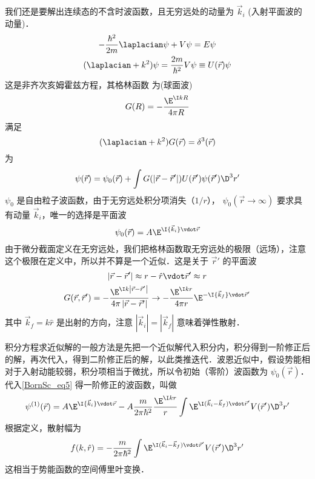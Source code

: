 
我们还是要解出连续态的不含时波函数，且无穷远处的动量为 $\vec k_i$ (入射平面波的动量)．
\begin{gather}
- \frac{{{\hbar ^2}}}{{2m}}{\laplacian}\psi  + V\psi  = E\psi \\
({\laplacian} + {k^2})\psi  = \frac{{2m}}{{{\hbar ^2}}}V\psi  \equiv U(\vec r)\psi
\end{gather}
这是非齐次亥姆霍兹方程，其格林函数%
为(球面波)
\begin{equation}
G(R) =  - \frac{{{\E^{\I kR}}}}{{4\pi R}}
\end{equation}
满足
\begin{equation}
({\laplacian} + {k^2})G(\vec r) = {\delta ^3}(\vec r)
\end{equation}
为
\begin{equation}\label{BornSc_eq5}
\psi (\vec r) = {\psi _0}(\vec r) + \int {G(\left| {\vec r - \vec r'} \right|)U(\vec r')\psi (\vec r'){\D ^3}r'} 
\end{equation}
$\psi_0$ 是自由粒子波函数，由于无穷远处积分项消失（$1/r$）， $\psi_0(\vec r\to\infty)$ 要求具有动量 $\vec k_i$，唯一的选择是平面波
 \begin{equation}
{\psi _0}(\vec r) = A{\E^{\I{{\vec k}_i} \vdot \vec r}}
\end{equation}
由于微分截面定义在无穷远处，我们把格林函数取无穷远处的极限（远场），注意这个极限在定义中，所以并不算是一个近似．这是关于 $\vec r'$ 的平面波
\begin{gather}
\left| {\vec r - \vec r'} \right| \approx r - \hat r \vdot \vec r' \approx r\\
G(\vec r,\vec r') =  - \frac{{{\E^{\I k\left| {\vec r - \vec r'} \right|}}}}{{4\pi \left| {\vec r - \vec r'} \right|}} \to  - \frac{{{\E^{\I kr}}}}{{4\pi r}}{\E^{ -\I {{\vec k}_f} \vdot \vec r'}}
\end{gather}
其中 ${\vec k_f} = k\hat r$ 是出射的方向，注意 $\left| {{{\vec k}_i}} \right| = \left| {{{\vec k}_f}} \right|$ 意味着弹性散射．

积分方程求近似解的一般方法是先把一个近似解代入积分内，积分得到一阶修正后的解，再次代入，得到二阶修正后的解，以此类推迭代．波恩近似中，假设势能相对于入射动能较弱，积分项相当于微扰，所以令初始（零阶）波函数为 $\psi_0(\vec r)$．代入\autoref{BornSc_eq5} 得一阶修正的波函数，叫做
\begin{equation}
{\psi ^{(1)}}(\vec r) = A{\E^{\I{{\vec k}_i} \vdot \vec r}} - A\frac{m}{{2\pi {\hbar ^2}}}\frac{{{\E^{\I kr}}}}{r}\int {{\E^{\I ({{\vec k}_i} - {{\vec k}_f}) \vdot \vec r'}}V(\vec r'){\D ^3}r'} 
\end{equation}
根据定义，散射幅为
\begin{equation}
f(k,\hat r) =  - \frac{m}{{2\pi {\hbar ^2}}}\int {{\E^{\I ({{\vec k}_i} - {{\vec k}_f}) \vdot \vec r'}}V(\vec r'){\D ^3}r'}
\end{equation}
这相当于势能函数的空间傅里叶变换．

